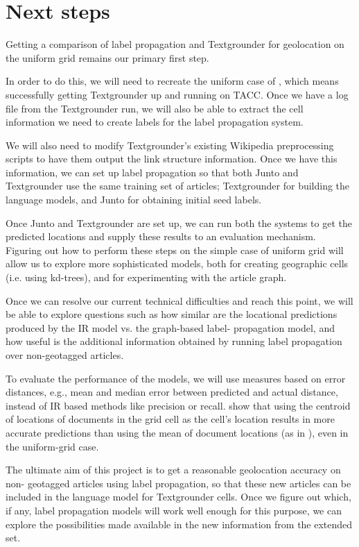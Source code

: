 \section{Next steps} Getting a comparison of label propagation and Textgrounder
for geolocation on the uniform grid remains our primary first step. 

\par In order to do this, we will need to recreate the uniform case of
\cite{rolleretal:12}, which means successfully getting Textgrounder up and
running on TACC. Once we have a log file from the Textgrounder run, we will also
be able to extract the cell information we need to create labels for the label
propagation system.  

\par  We will also need to modify Textgrounder's existing Wikipedia
preprocessing scripts to have them output the link structure information. Once
we have this information, we can set up label propagation so that both Junto
and Textgrounder use the same training set of articles; Textgrounder for
building the language models, and Junto for obtaining initial seed labels.

\par Once Junto and Textgrounder are set up, we can run both the systems to
get the predicted locations and supply these results to an evaluation
mechanism. Figuring out how to perform these steps on the simple case of
uniform grid will allow us to explore more sophisticated models, both for
creating geographic cells (i.e. using kd-trees), and for experimenting with
the article graph. 

\par Once we can resolve our current technical difficulties
and reach this point, we will be able to explore questions such as how similar
are the locational predictions produced by the IR model vs. the graph-based
label- propagation model, and how useful is the additional information
obtained by running label propagation over non-geotagged articles. 

\par To evaluate the performance of the models, we will use measures based on
error distances, e.g., mean and median error between predicted and actual
distance, instead of IR based methods like precision or recall.
\cite{rolleretal:12} show that using the centroid of locations of documents in
the grid cell as the cell's location results in more accurate predictions than
using the mean of document locations (as in \cite{wing-baldridge:11}), even in
the uniform-grid case.

\par The ultimate aim of this project is to get a reasonable geolocation
accuracy on non- geotagged articles using label propagation, so that these new
articles can be included in the language model for Textgrounder cells. Once we
figure out which, if any, label propagation models will work well enough for
this purpose, we can explore the possibilities made available in the new
information from the extended set.
